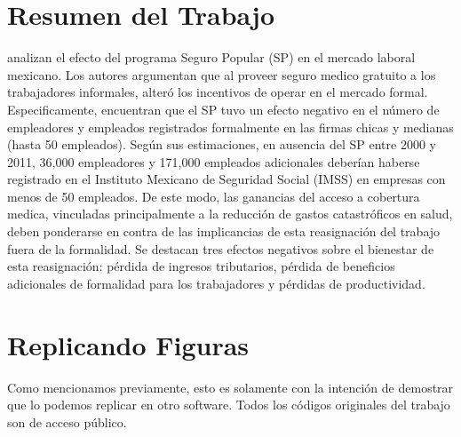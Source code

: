 \documentclass[9pt]{article}
\begin{document}
\section*{Resumen del Trabajo}
\cite{10.1257/pol.6.4.71}  analizan el efecto del programa Seguro Popular (SP) en el mercado laboral mexicano. Los autores argumentan que al proveer seguro medico gratuito a los trabajadores informales, alteró los incentivos de operar en el mercado formal. Especificamente, encuentran que el SP tuvo un efecto negativo en el número de empleadores y empleados registrados formalmente en las firmas chicas y medianas (hasta 50 empleados). Según sus estimaciones, en ausencia del SP entre 2000 y 2011, 36,000 empleadores y 171,000 empleados adicionales deberían haberse registrado en el Instituto Mexicano de Seguridad Social (IMSS) en empresas con menos de 50 empleados. De este modo, las ganancias del acceso a cobertura medica, vinculadas principalmente a la reducción de gastos catastróficos en salud, deben ponderarse en contra de las implicancias de esta reasignación del trabajo fuera de la formalidad. Se destacan tres efectos negativos sobre el bienestar de esta reasignación: pérdida de ingresos tributarios, pérdida de beneficios adicionales de formalidad para los trabajadores y pérdidas de productividad.

\section*{Replicando Figuras}
 Como mencionamos previamente, esto es solamente con la intenci\'on de demostrar que lo podemos replicar en otro software. Todos los c\'odigos originales del trabajo son de acceso p\'ublico.
 
\end{document}
